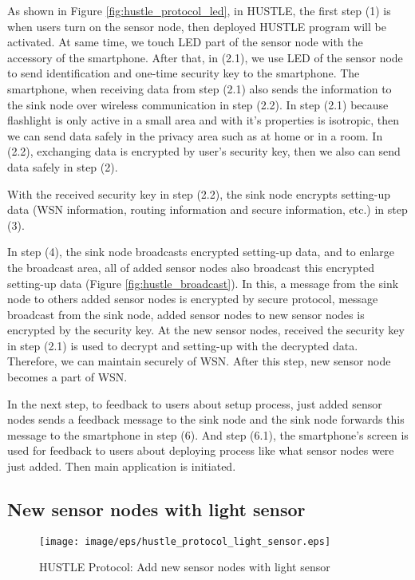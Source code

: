 As shown in Figure \ref{fig:hustle_protocol_led}, in HUSTLE, the first step (1) is when users turn on the sensor node, then deployed HUSTLE program will be activated. At same time, we touch LED part of the sensor node with the accessory of the smartphone. After that, in (2.1), we use LED of the sensor node to send identification and one-time security key to the smartphone. The smartphone, when receiving data from step (2.1) also sends the information to the sink node over wireless communication in step (2.2). In step (2.1) because flashlight is only active in a small area and with it's properties is isotropic, then we can send data safely in the privacy area such as at home or in a room. In (2.2), exchanging data is encrypted by user's security key, then we also can send data safely in step (2).

With the received security key in step (2.2), the sink node encrypts setting-up data (WSN information, routing information and secure information, etc.) in step (3).

In step (4), the sink node broadcasts encrypted setting-up data, and to enlarge the broadcast area, all of added sensor nodes also broadcast this encrypted setting-up data (Figure \ref{fig:hustle_broadcast}). In this, a message from the sink node to others added sensor nodes is encrypted by secure protocol, message broadcast from the sink node, added sensor nodes to new sensor nodes is encrypted by the security key. At the new sensor nodes, received the security key in step (2.1) is used to decrypt and setting-up with the decrypted data. Therefore, we can maintain securely of WSN. After this step, new sensor node becomes a part of WSN.

In the next step, to feedback to users about setup process, just added sensor nodes sends a feedback message to the sink node and the sink node forwards this message to the smartphone in step (6). And step (6.1), the smartphone's screen is used for feedback to users about deploying process like what sensor nodes were just added. Then main application is initiated.

\subsection{New sensor nodes with light sensor}

\begin{figure}[tb]
\begin{center}
\texttt{[image: image/eps/hustle\_protocol\_light\_sensor.eps]}
\caption{HUSTLE Protocol: Add new sensor nodes with light sensor}
\label{fig:hustle_protocol_light_sensor}
\end{center}
\end{figure}

